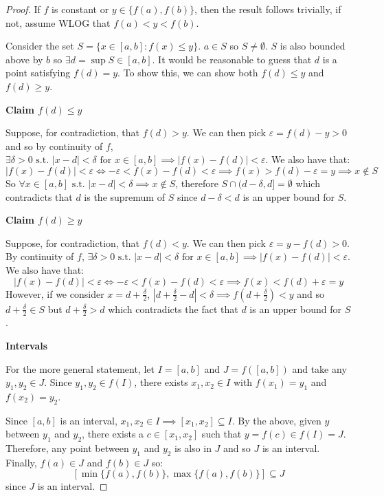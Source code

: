 \documentclass[../main.tex]{subfiles}
\begin{document}
\begin{proof}
  If $f$ is constant or $y \in \{f(a), f(b)\}$, then the result follows trivially, if not, assume WLOG that $f(a) < y < f(b)$.

  Consider the set $S = \{x \in [a, b]: f(x) \leq y\}$.
  $a \in S$ so $S \neq \emptyset$.
  $S$ is also bounded above by $b$ so $\exists d = \sup S \in [a, b]$.
  It would be reasonable to guess that $d$ is a point satisfying $f(d) = y$.
  To show this, we can show both $f(d) \leq y$ and $f(d) \geq y$.

  \textbf{Claim $f(d) \leq y$}\par
  Suppose, for contradiction, that $f(d) > y$.
  We can then pick $\varepsilon = f(d) - y > 0$ and so by continuity of $f$, $\exists \delta > 0 \text{ s.t. } |x - d| < \delta \text{ for $x \in [a, b]$} \implies |f(x) - f(d)| <\varepsilon$.
  We also have that:
  \[
    |f(x) - f(d)| < \varepsilon \iff - \varepsilon < f(x) - f(d) < \varepsilon \implies f(x) > f(d) - \varepsilon = y \implies x \notin S
  \]
  So $\forall x \in [a, b] \text{ s.t. } |x - d| < \delta \implies x \notin S$, therefore $S \cap (d - \delta, d] = \emptyset$ which contradicts that $d$ is the supremum of $S$ since $d - \delta < d$ is an upper bound for $S$.

  \textbf{Claim $f(d) \geq y$}\par
  Suppose, for contradiction, that $f(d) < y$.
  We can then pick $\varepsilon = y - f(d) > 0$.
  By continuity of $f$, $\exists \delta > 0 \text{ s.t. } |x - d| < \delta \text{ for $x \in [a, b]$} \implies |f(x) - f(d)| < \varepsilon$.
  We also have that:
  \[
    |f(x) - f(d)| < \varepsilon \iff - \varepsilon < f(x) - f(d) < \varepsilon \implies f(x) < f(d) + \varepsilon = y
  \]
  However, if we consider $x = d + \frac{\delta}{2}$, $|d + \frac{\delta}{2} - d| < \delta \implies f(d + \frac{\delta}{2}) < y$ and so $d + \frac{\delta}{2} \in S$ but $d + \frac{\delta}{2} > d$ which contradicts the fact that $d$ is an upper bound for $S$.

  \textbf{Intervals}\par
  For the more general statement, let $I = [a, b]$ and $J = f([a, b])$ and take any $y_1, y_2 \in J$.
  Since $y_1, y_2 \in f(I)$, there exists $x_1, x_2 \in I$ with $f(x_1) = y_1$ and $f(x_2) = y_2$.

  Since $[a, b]$ is an interval, $x_1, x_2 \in I \implies [x_1, x_2] \subseteq I$.
  By the above, given $y$ between $y_1$ and $y_2$, there exists a $c \in [x_1, x_2]$ such that $y = f(c) \in f(I) = J$.
  Therefore, any point between $y_1$ and $y_2$ is also in $J$ and so $J$ is an interval.
  Finally, $f(a) \in J$ and $f(b) \in J$ so:
  \[
    [\min\{f(a), f(b)\}, \max\{f(a), f(b)\}] \subseteq J
  \]
  since $J$ is an interval.
\end{proof}
\end{document}
